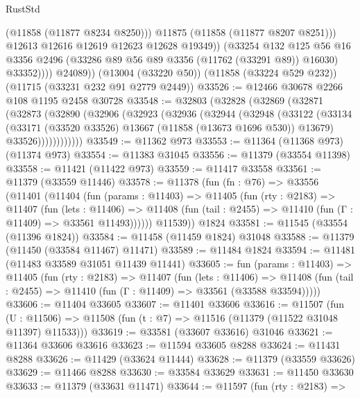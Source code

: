 \begin{lexlean}{RustStd}
\begin{coremodule}
                      (@11858 (@11877 @8234 @8250)))
                    @11875
                    (@11858 (@11877 @8207 @8251)))
                  @12613
                  @12616
                  @12619
                  @12623
                  @12628
                  @19349))
              (@33254
                @132
                @125
                @56
                @16
                @3356
                @2496
                (@33286 @89 @56 @89 @3356 (@11762 (@33291 @89)) @16030)
                @33352))))
        @24089))
    (@13004 (@33220 @50))
    (@11858 (@33224 @529 @232))
    (@11715 (@33231 @232 @91 @2779 @2449))
@33526 := @12466 @30678 @2266 @108 @1195 @2458 @30728
@33548 := @32803
    (@32828
      (@32869
        (@32871
          (@32873
            (@32890
              (@32906
                (@32923
                  (@32936
                    (@32944
                      (@32948
                        (@33122
                          (@33134
                            (@33171 (@33520 @33526) @13667 (@11858 (@13673 @1696 @530)) @13679)
                            @33526))))))))))))
@33549 := @11362 @973
@33553 := @11364 (@11368 @973) (@11374 @973)
@33554 := @11383 @31045
@33556 := @11379 (@33554 @11398)
@33558 := @11421 (@11422 @973)
@33559 := @11417 @33558
@33561 := @11379 (@33559 @11446)
@33578 := @11378
    (fun (fn : @76) =>
    @33556
      (@11401
        (@11404
          (fun (params : @11403) =>
          @11405
            (fun (rty : @2183) =>
            @11407
              (fun (lets : @11406) =>
              @11408 (fun (tail : @2455) => @11410 (fun (Γ : @11409) => @33561 @11493))))))
        @11539))
    @1824
@33581 := @11545 (@33554 (@11396 @1824))
@33584 := @11458 (@11459 @1824) @31048
@33588 := @11379 (@11450 (@33584 @11467) @11471)
@33589 := @11484 @1824
@33594 := @11481 (@11483 @33589 @31051 @11439 @11441)
@33605 := fun (params : @11403) =>
  @11405
    (fun (rty : @2183) =>
    @11407
      (fun (lets : @11406) =>
      @11408 (fun (tail : @2455) => @11410 (fun (Γ : @11409) => @33561 (@33588 @33594)))))
@33606 := @11404 @33605
@33607 := @11401 @33606
@33616 := @11507
    (fun (U : @11506) => @11508 (fun (t : @7) => @11516 (@11379 (@11522 @31048 @11397) @11533)))
@33619 := @33581 (@33607 @33616) @31046
@33621 := @11364 @33606 @33616
@33623 := @11594 @33605 @8288
@33624 := @11431 @8288
@33626 := @11429 (@33624 @11444)
@33628 := @11379 (@33559 @33626)
@33629 := @11466 @8288
@33630 := @33584 @33629
@33631 := @11450 @33630
@33633 := @11379 (@33631 @11471)
@33644 := @11597
    (fun (rty : @2183) =>

\end{coremodule}
\end{lexlean}

